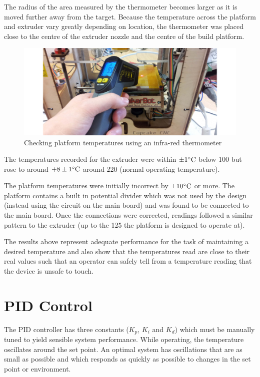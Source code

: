 		The radius of the area measured by the thermometer becomes larger as it is
		moved further away from the target. Because the temperature across the
		platform and extruder vary greatly depending on location, the thermometer
		was placed close to the centre of the extruder nozzle and the centre of the
		build platform.
		
		\begin{figure}
			\includegraphics[width=1\textwidth]{diagrams/thermometer.pdf}
			\caption{Checking platform temperatures using an infra-red thermometer}
			\label{fig:thermometer}
		\end{figure}
		
		The temperatures recorded for the extruder were within $\pm1^\circ\textrm{C}$ below
		100\dC{} but rose to around $+8\pm1^\circ\textrm{C}$ around 220\dC{} (normal operating
		temperature).
		
		The platform temperatures were initially incorrect by $\pm10^\circ\textrm{C}$ or more.
		The platform contains a built in potential divider which was not used by the
		design (instead using the circuit on the main board) and was found to be
		connected to the main board. Once the connections were corrected, readings
		followed a similar pattern to the extruder (up to the 125\dC{} the platform
		is designed to operate at).
		
		The results above represent adequate performance for the task of maintaining
		a desired temperature and also show that the temperatures read are close to
		their real values such that an operator can safely tell from a temperature
		reading that the device is unsafe to touch.
	
	\section{PID Control}
		
		
		\label{sec:pidtraning}
		
		The PID controller has three constants ($K_p$, $K_i$ and $K_d$) which must
		be manually tuned to yield sensible system performance. While operating, the
		temperature oscillates around the set point. An optimal system has
		oscillations that are as small as possible and which responds as quickly as
		possible to changes in the set point or environment.
		
